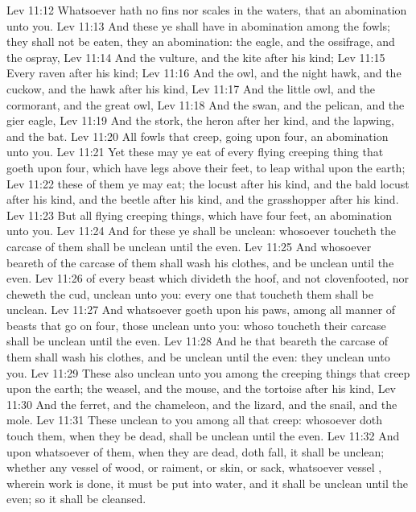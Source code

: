 \vs Lev 11:12 Whatsoever hath no fins nor scales in the waters, that  an abomination unto you.
\vs Lev 11:13 And these  ye shall have in abomination among the fowls; they shall not be eaten, they  an abomination: the eagle, and the ossifrage, and the ospray,
\vs Lev 11:14 And the vulture, and the kite after his kind;
\vs Lev 11:15 Every raven after his kind;
\vs Lev 11:16 And the owl, and the night hawk, and the cuckow, and the hawk after his kind,
\vs Lev 11:17 And the little owl, and the cormorant, and the great owl,
\vs Lev 11:18 And the swan, and the pelican, and the gier eagle,
\vs Lev 11:19 And the stork, the heron after her kind, and the lapwing, and the bat.
\vs Lev 11:20 All fowls that creep, going upon  four,  an abomination unto you.
\vs Lev 11:21 Yet these may ye eat of every flying creeping thing that goeth upon  four, which have legs above their feet, to leap withal upon the earth;
\vs Lev 11:22  these of them ye may eat; the locust after his kind, and the bald locust after his kind, and the beetle after his kind, and the grasshopper after his kind.
\vs Lev 11:23 But all  flying creeping things, which have four feet,  an abomination unto you.
\vs Lev 11:24 And for these ye shall be unclean: whosoever toucheth the carcase of them shall be unclean until the even.
\vs Lev 11:25 And whosoever beareth  of the carcase of them shall wash his clothes, and be unclean until the even.
\vs Lev 11:26  of every beast which divideth the hoof, and  not clovenfooted, nor cheweth the cud,  unclean unto you: every one that toucheth them shall be unclean.
\vs Lev 11:27 And whatsoever goeth upon his paws, among all manner of beasts that go on  four, those  unclean unto you: whoso toucheth their carcase shall be unclean until the even.
\vs Lev 11:28 And he that beareth the carcase of them shall wash his clothes, and be unclean until the even: they  unclean unto you.
\vs Lev 11:29 These also  unclean unto you among the creeping things that creep upon the earth; the weasel, and the mouse, and the tortoise after his kind,
\vs Lev 11:30 And the ferret, and the chameleon, and the lizard, and the snail, and the mole.
\vs Lev 11:31 These  unclean to you among all that creep: whosoever doth touch them, when they be dead, shall be unclean until the even.
\vs Lev 11:32 And upon whatsoever  of them, when they are dead, doth fall, it shall be unclean; whether  any vessel of wood, or raiment, or skin, or sack, whatsoever vessel , wherein  work is done, it must be put into water, and it shall be unclean until the even; so it shall be cleansed.
